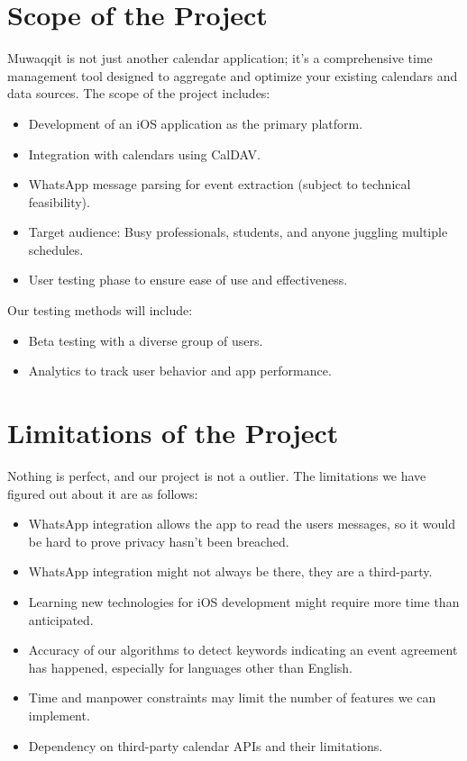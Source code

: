 \documentclass[12pt,a4paper]{article}
\begin{document}
\section{Scope of the Project}

Muwaqqit is not just another calendar application; it's a comprehensive time management tool designed to aggregate and optimize your existing calendars and data sources. The scope of the project includes:

\begin{itemize}
    \item Development of an iOS application as the primary platform.
    \item Integration with calendars using CalDAV.
    \item WhatsApp message parsing for event extraction (subject to technical feasibility).
    \item Target audience: Busy professionals, students, and anyone juggling multiple schedules.
    \item User testing phase to ensure ease of use and effectiveness.
\end{itemize}

Our testing methods will include:
\begin{itemize}
    \item Beta testing with a diverse group of users.
    \item Analytics to track user behavior and app performance.
\end{itemize}

\section{Limitations of the Project}

Nothing is perfect, and our project is not a outlier. The limitations we have figured out about it are as follows:

\begin{itemize}
    \item WhatsApp integration allows the app to read the users messages, so it would be hard to prove privacy hasn't been breached.
    \item WhatsApp integration might not always be there, they are a third-party.
    \item Learning new technologies for iOS development might require more time than anticipated.
    \item Accuracy of our algorithms to detect keywords indicating an event agreement has happened, especially for languages other than English.
    \item Time and manpower constraints may limit the number of features we can implement.
    \item Dependency on third-party calendar APIs and their limitations.
\end{itemize}
\end{document}
